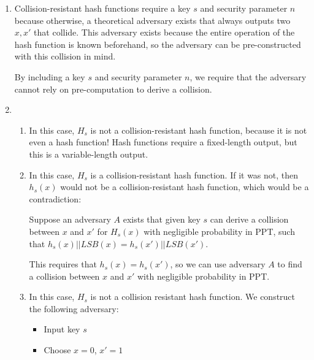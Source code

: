 


\begin{enumerate}[label=(\alph*)]

      \item

        Collision-resistant hash functions require a key $s$ and security parameter $n$ because otherwise, a theoretical adversary exists that always outputs two $x, x'$ that collide. This adversary exists because the entire operation of the hash function is known beforehand, so the adversary can be pre-constructed with this collision in mind.

        By including a key $s$ and security parameter $n$, we require that the adversary cannot rely on pre-computation to derive a collision.

      \item
        \begin{enumerate}[label=(\roman*)]
          \item
            In this case, $H_s$ is not a collision-resistant hash function, because it is not even a hash function! Hash functions require a fixed-length output, but this is a variable-length output.

          \item
            In this case, $H_s$ is a collision-resistant hash function. If it was not, then $h_s(x)$ would not be a collision-resistant hash function, which would be a contradiction:

            Suppose an adversary $A$ exists that given key $s$ can derive a collision between $x$ and $x'$ for $H_s(x)$ with negligible probability in PPT, such that $h_s(x) || LSB(x) = h_s(x') || LSB(x')$.

            This requires that $h_s(x) = h_s(x')$, so we can use adversary $A$ to find a collision between $x$ and $x'$ with negligible probability in PPT.

          \item
            In this case, $H_s$ is not a collision resistant hash function. We construct the following adversary:

            \begin{itemize}
                
              \item
            Input key $s$

              \item
            Choose $x = 0$, $x' = 1$


\end{itemize}
\end{enumerate}
\end{enumerate}
